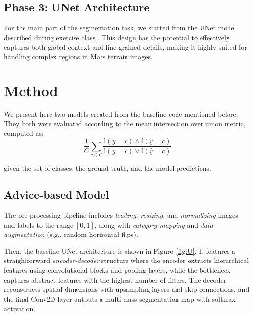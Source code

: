 \documentclass[11pt]{article}
\begin{document}
\begin{multicols*}{2}
    \subsection{Phase 3: UNet Architecture}

    For the main part of the segmentation task, we started from the UNet model described during exercise class \cite{unet}. This design has the potential to effectively captures both global context and fine-grained details, making it highly suited for handling complex regions in Mars terrain images.


    \section{Method} %
    \label{sec:method}

    We present here two models created from the baseline code mentioned before. They both were evaluated according to the mean intersection over union metric, computed as:
    \begin{equation*}
    \frac{1}{C}\sum_{c\in C}\frac{\mathbb{I}(y=c)\wedge \mathbb{I}(\hat y=c)}{\mathbb{I}(y=c)\vee \mathbb{I}(\hat y=c)}
    \end{equation*}

    given the set of classes, the ground truth, and the model predictions.

    \subsection{Advice-based Model}

    The pre-processing pipeline includes \emph{loading}, \emph{resizing}, and \emph{normalizing} images and labels to the range $[0,1]$, along with \emph{category mapping} and \emph{data augmentation} (e.g., random horizontal flips).
    
    Then, the baseline UNet architecture is shown in Figure~\ref{fig:U}. It features a straightforward \emph{encoder-decoder} structure where the encoder extracts hierarchical features using convolutional blocks and pooling layers, while the bottleneck captures abstract features with the highest number of filters. The decoder reconstructs spatial dimensions with upsampling layers and skip connections, and the final Conv2D layer outputs a multi-class segmentation map with softmax activation.


\end{multicols*}
\end{document}
